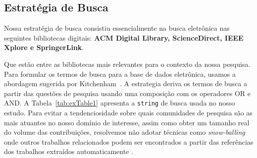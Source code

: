 \subsection{Estratégia de Busca}\label{estrategia_busca}
	Nossa estratégia de busca consistiu essencialmente na busca eletrônica nas seguintes bibliotecas digitais: \textbf{ACM Digital Library, ScienceDirect, IEEE Xplore e SpringerLink}.


\noindent Que estão entre as bibliotecas mais relevantes para o contexto da nossa pesquisa. Para formular os termos de busca para a base de dados eletrônica, usamos a abordagem sugerida por Kitchenham~\cite{kitchenham:techReport2007,budgen:ppig2008}. A estrategia 
deriva os termos de busca a partir das questões de pesquisa usando uma composição com os operadores OR e AND. A  Tabela~\ref{tab:exTable1} apresenta a \texttt{string} de busca usada no nosso estudo. Para evitar a tendenciosidade sobre quais comunidades de pesquisa s\~{a}o as mais atuantes no nosso dom\'{i}nio de interesse, assim como obter um tamanho real do volume das contribuições, resolvemos não adotar técnicas como \emph{snow-balling} onde outros trabalhos relacionados podem ser encontrados a partir das referências dos trabalhos extraídos automaticamente \cite{budgen:ppig2008}.

